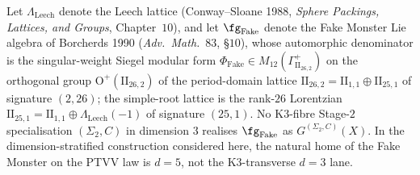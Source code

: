 \begin{theorem}[Leech-rank obstruction in the K3-fibre \texorpdfstring{$d = 3$}{d = 3} lane]
\label{thm:cy-c-beyond-leech-rank-obstruction}
Let $\Lambda_{\mathrm{Leech}}$ denote the Leech lattice
(Conway--Sloane 1988, \emph{Sphere Packings, Lattices, and Groups},
Chapter~$10$), and let $\fg_{\mathrm{Fake}}$ denote the Fake Monster
Lie algebra of Borcherds 1990 (\emph{Adv.\ Math.}~83, \S$10$), whose
automorphic denominator is the singular-weight Siegel modular form
$\Phi_{\mathrm{Fake}} \in M_{12}(\Gamma^+_{\mathrm{II}_{26,2}})$ on
the orthogonal group $\mathrm{O}^+(\mathrm{II}_{26,2})$ of the
period-domain lattice $\mathrm{II}_{26,2} = \mathrm{II}_{1,1}
\oplus \mathrm{II}_{25,1}$ of signature $(2, 26)$; the simple-root
lattice is the rank-$26$ Lorentzian $\mathrm{II}_{25,1} =
\mathrm{II}_{1,1} \oplus \Lambda_{\mathrm{Leech}}(-1)$ of
signature $(25, 1)$.
No K3-fibre Stage-$2$ specialisation $(\Sigma_2,C)$ in dimension \(3\)
realises $\fg_{\mathrm{Fake}}$ as \(G^{(\Sigma_2,C)}(X)\). In the
dimension-stratified construction considered here, the natural home of
the Fake Monster on the PTVV law is \(d=5\), not the K3-transverse
\(d=3\) lane.
\end{theorem}

